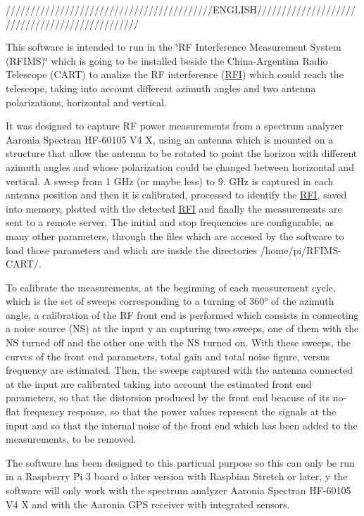//////////////////////////////////////////\+E\+N\+G\+L\+I\+S\+H///////////////////////////////////////////////

This software is intended to run in the \char`\"{}\+R\+F Interference Measurement System (\+R\+F\+I\+M\+S)\char`\"{} which is going to be installed beside the China-\/\+Argentina Radio Telescope (C\+A\+RT) to analize the RF interference (\hyperlink{structRFI}{R\+FI}) which could reach the telescope, taking into account different azimuth angles and two antenna polarizations, horizontal and vertical.

It was designed to capture RF power measurements from a spectrum analyzer Aaronia Spectran H\+F-\/60105 V4 X, using an antenna which is mounted on a structure that allow the antenna to be rotated to point the horizon with different azimuth angles and whose polarization could be changed between horizontal and vertical. A sweep from 1 G\+Hz (or maybe less) to 9. G\+Hz is captured in each antenna position and then it is calibrated, processed to identify the \hyperlink{structRFI}{R\+FI}, saved into memory, plotted with the detected \hyperlink{structRFI}{R\+FI} and finally the measurements are sent to a remote server. The initial and stop frequencies are configurable, as many other parameters, through the files which are accesed by the software to load those parameters and which are inside the directories /home/pi/\+R\+F\+I\+M\+S-\/\+C\+A\+R\+T/.

To calibrate the measurements, at the beginning of each measurement cycle, which is the set of sweeps corresponding to a turning of 360° of the azimuth angle, a calibration of the RF front end is performed which consists in connecting a noise source (NS) at the input y an capturing two sweeps, one of them with the NS turned off and the other one with the NS turned on. With these sweeps, the curves of the front end parameters, total gain and total noise figure, versus frequency are estimated. Then, the sweeps captured with the antenna connected at the input are calibrated taking into account the estimated front end parameters, so that the distorsion produced by the front end beacuse of its no-\/flat frequency response, so that the power values represent the signals at the input and so that the internal noise of the front end which has been added to the measurements, to be removed.

The software has been designed to this particual purpose so this can only be run in a Raspberry Pi 3 board o later version with Raspbian Stretch or later, y the software will only work with the spectrum analyzer Aaronia Spectran H\+F-\/60105 V4 X and with the Aaronia G\+PS receiver with integrated sensors.

